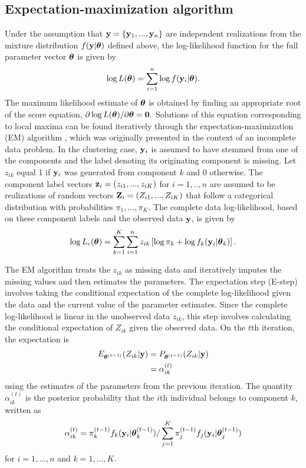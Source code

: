 \subsection{Expectation-maximization algorithm}\label{sec:em}
Under the assumption that $\mathbf y = \{\mathbf y_{1},...,\mathbf y_{n}\}$ are independent realizations from the mixture distribution $f(\mathbf y | \boldsymbol\theta)$ defined above, the log-likelihood function for the full parameter vector $\boldsymbol \theta$ is given by
$$\log L(\boldsymbol\theta)=\sum^{n}_{i=1}\log f(\mathbf y_{i}|\boldsymbol \theta).$$
The maximum likelihood estimate of $\boldsymbol\theta$ is obtained by finding an appropriate root of the score equation, $\partial \log L(\boldsymbol\theta)/\partial \boldsymbol\theta=\mathbf 0.$ Solutions of this equation corresponding to local maxima can be found iteratively through the expectation-maximization (EM) algorithm \cite{dempster1977}, which was originally presented in the context of an incomplete data problem. In the clustering case, $\mathbf y_{i}$ is assumed to have stemmed from one of the components and the label denoting its originating component is missing. Let $z_{ik}$ equal 1 if $\mathbf y_{i}$ was generated from component $k$ and 0 otherwise. The component label vectors $\mathbf z_{i}=(z_{i1},...,z_{iK})$ for $i=1,..,n$ are assumed to be realizations of random vectors $\mathbf Z_{i}=(Z_{i1},...,Z_{iK})$ that follow a categorical distribution with probabilities $\pi_{1},...,\pi_{K}$. The complete data log-likelihood, based on these component labels and the observed data $\mathbf y$, is given by
$$\log L_{c}(\boldsymbol \theta) =  \sum^{K}_{k=1}\sum^{n}_{i=1}z_{ik}\left[\log \pi_{k}+\log f_{k}(\mathbf y_{i}|\boldsymbol\theta_k)\right].$$

The EM algorithm treats the $z_{ik}$ as missing data and iteratively imputes the missing values and then  estimates the parameters. The expectation step (E-step) involves taking the conditional expectation of the complete log-likelihood given the data and the current value of the parameter estimates. Since the complete log-likelihood is linear in the unobserved data $z_{ik}$, this step involves calculating the conditional expectation of $Z_{ik}$ given the observed data. On the $t$th iteration, the expectation is
\begin{align*}
E_{\boldsymbol\theta^{(t-1)}}( Z_{ik}|\mathbf y) &= P_{\boldsymbol\theta^{(t-1)}}( Z_{ik}|\mathbf y)\\
&=\alpha_{ik}^{(t)}
\end{align*}
using the estimates of the parameters from the previous iteration. The quantity $\alpha_{ik}^{(t)}$ is the posterior probability that the $i$th individual belongs to component $k$, written as
$$\alpha_{ik}^{(t)}=\pi_{k}^{(t-1)}f_{k}(\mathbf y_{i}|\boldsymbol\theta^{(t-1)}_{k})/\sum_{j=1}^{K}\pi_{j}^{(t-1)}f_{j}(\mathbf y_{i}|\boldsymbol \theta_{j}^{(t-1)})$$
for $i=1,...,n$ and $k=1,...,K$.

